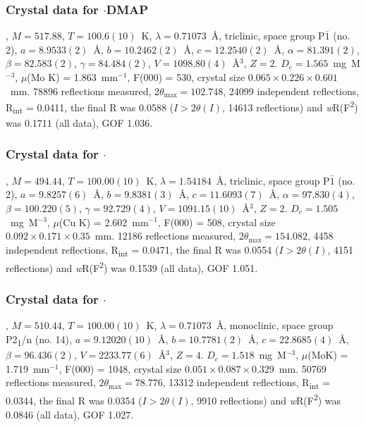 \begin{refsection}
\subsubsection{Crystal data for \texorpdfstring{$\cdot$DMAP}{C24 H25 Cl N3 O3 Se}}
, $M=517.88$, $T=100.6(10)$~K, $\lambda=0.71073$~\AA, triclinic, space group P$\bar{1}$ (no. 2), $a = 8.9533(2)$~\AA, $b = 10.2462(2)$~\AA, $c = 12.2540(2)$~\AA, $\alpha = 81.391(2)$\degree, $\beta = 82.583(2)$\degree, $\gamma = 84.484(2)$\degree, $V = 1098.80(4)$~\AA$^{3}$, $Z = 2$. $D_{c}= 1.565$~mg~M$^{-3}$, $\mu$(Mo K\a) = 1.863~mm$^{-1}$, F(000) = 530, crystal size $0.065 \times 0.226 \times 0.601$~mm. 78896 reflections measured, $2\theta_{\mathrm{max}}=102.748$\degree, 24099 independent reflections, R\textsubscript{int} = 0.0411, the final R was 0.0588 ($I > 2\theta(I)$, 14613 reflections) and \emph{w}R(F\textsuperscript{2}) was 0.1711 (all data), GOF 1.036.

\subsubsection{Crystal data for \texorpdfstring{$\cdot$}{C25 H25 N3 O3 Se}}
, $M=494.44$, $T=100.00(10)$~K, $\lambda=1.54184$~\AA, triclinic, space group P$\bar{1}$ (no. 2), $a = 9.8257(6)$~\AA, $b = 9.8381(3)$~\AA, $c = 11.6093(7)$~\AA, $\alpha = 97.830(4)$\degree, $\beta = 100.220(5)$\degree, $\gamma = 92.729(4)$\degree, $V = 1091.15(10)$~\AA$^{3}$, $Z = 2$. $D_{c}= 1.505$~mg~M$^{-3}$, $\mu$(Cu K\a) = 2.602~mm$^{-1}$, F(000) = 508, crystal size $0.092 \times 0.171 \times 0.35$~mm. 12186 reflections measured, $2\theta_{\mathrm{max}}=154.082$\degree, 4458 independent reflections, R\textsubscript{int} = 0.0471, the final R was 0.0554 ($I > 2\theta(I)$, 4151 reflections) and \emph{w}R(F\textsuperscript{2}) was 0.1539 (all data), GOF 1.051.

\subsubsection{Crystal data for \texorpdfstring{$\cdot$}{C25 H25 N3 O4 Se}}
, $M=510.44$, $T=100.00(10)$~K, $\lambda=0.71073$~\AA, monoclinic, space group P2\textsubscript{1}/n (no. 14), $a = 9.12020(10)$~\AA, $b = 10.7781(2)$~\AA, $c = 22.8685(4)$~\AA, $\beta = 96.436(2)$\degree, $V = 2233.77(6)$~\AA$^{3}$, $Z = 4$. $D_{c}= 1.518$~mg~M$^{-3}$, $\mu$(MoK\a) = 1.719~mm$^{-1}$, F(000) = 1048, crystal size $0.051 \times 0.087 \times 0.329$~mm. 50769 reflections measured, $2\theta_{\mathrm{max}}=78.776$\degree, 13312 independent reflections, R\textsubscript{int} = 0.0344, the final R was 0.0354 ($I > 2\theta(I)$, 9910 reflections) and \emph{w}R(F\textsuperscript{2}) was 0.0846 (all data), GOF 1.027.


\end{refsection}
